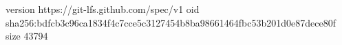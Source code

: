 version https://git-lfs.github.com/spec/v1
oid sha256:bdfcb3c96ca1834f4c7cce5c3127454b8ba98661464fbc53b201d0e87dece80f
size 43794
